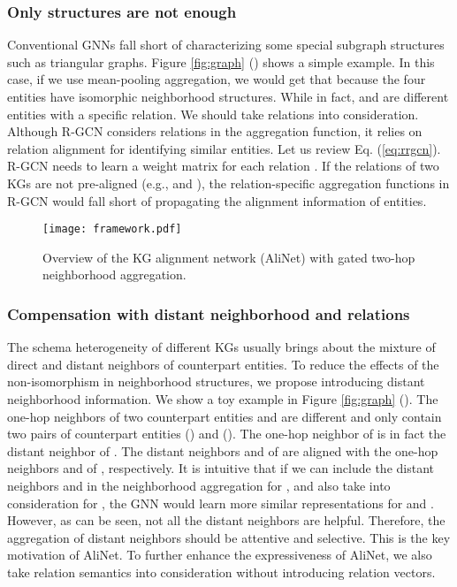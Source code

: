 \documentclass[letterpaper]{article} \usepackage{aaai20}  \usepackage{times}  \usepackage{helvet} \usepackage{courier}  \usepackage[hyphens]{url}  \usepackage{graphicx} \urlstyle{rm} \def\UrlFont{\rm}  \frenchspacing  \setlength{\pdfpagewidth}{8.5in}  \setlength{\pdfpageheight}{11in}  \usepackage{amsmath}
\begin{document}
\subsubsection{Only structures are not enough} Conventional GNNs fall short of characterizing  some special subgraph structures such as triangular graphs. Figure \ref{fig:graph} () shows a simple example. In this case, if we use mean-pooling aggregation, we would get that  because the four entities have isomorphic neighborhood structures. While in fact,  and  are different entities with a specific relation. We should take relations into consideration. Although R-GCN \cite{R-GCN} considers relations in the aggregation function, it relies on relation alignment for identifying similar entities. Let us review Eq. (\ref{eq:rrgcn}). R-GCN needs to learn a weight matrix  for each relation . If the relations of two KGs are not pre-aligned (e.g.,  and ), the relation-specific aggregation functions in R-GCN would fall short of propagating the alignment information of entities.

\begin{figure*}[!t]
	\center
	\texttt{[image: framework.pdf]}
	\caption{Overview of the KG alignment network (AliNet) with gated two-hop neighborhood aggregation.}
	\label{fig:alinet}
\end{figure*}

\subsubsection{Compensation with distant neighborhood and relations} The schema heterogeneity of different KGs usually brings about the mixture of direct and distant neighbors of counterpart entities. To reduce the effects of the non-isomorphism in neighborhood structures, we propose introducing distant neighborhood information. We show a toy example in Figure \ref{fig:graph} (). The one-hop neighbors of two counterpart entities  and  are different and only contain two pairs of counterpart entities () and (). The one-hop neighbor  of  is in fact the distant neighbor  of . The distant neighbors  and  of  are aligned with the one-hop neighbors  and  of , respectively. It is intuitive that if we can include the distant neighbors  and  in the neighborhood aggregation for , and also take  into consideration for , the GNN would learn more similar representations for  and . However, as can be seen, not all the distant neighbors are helpful. Therefore, the aggregation of distant neighbors should be attentive and selective. This is the key motivation of AliNet. To further enhance the expressiveness of AliNet, we also take relation semantics into consideration without introducing relation vectors.
\end{document}
